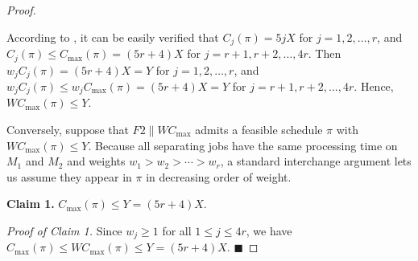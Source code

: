 ﻿\documentclass[12pt]{article}
\renewcommand{\thefigure}{\arabic{figure}}
\begin{document}
\begin{sloppypar}
\begin{proof}
\begin{figure}[H]
                \label{fig:nphard-3-partition}
            \end{figure}   
            
            According to , it can be easily verified that $C_j(\pi)=5jX$ for $j=1, 2, \ldots, r$, and $C_j(\pi) \leq C_{\max}(\pi)=(5r+4)X$ for $j=r+1, r+2, \ldots, 4r$. Then $w_j C_j(\pi)=(5r+4)X=Y$ for $j=1, 2, \ldots, r$, and $w_j C_j(\pi) \leq w_j C_{\max}(\pi)=(5r+4)X=Y$ for $j=r+1, r+2, \ldots, 4r$.      
            Hence, $W C_{\max}(\pi) \leq Y$.
            
            Conversely, suppose that $F2 \parallel WC_{\max}$ admits a feasible schedule $\pi$ with $W C_{\max}(\pi) \leq Y$. Because all separating jobs have the same processing time on $M_1$ and $M_2$ and weights $w_1 >w_2 > \cdots > w_r$, a standard interchange argument lets us assume they appear in $\pi$ in decreasing order of weight. 
            
            \textbf{Claim 1.} $C_{\max}(\pi) \leq Y=(5r+4)X$.
            
            \textit{Proof of Claim 1.}  Since $w_j \geq 1$ for all $1 \leq j \leq 4r$, we have $C_{\max}(\pi) \leq WC_{\max}(\pi) \leq Y=(5r+4)X$. \hfill$\blacksquare$
            

\end{proof}
\end{sloppypar}
\end{document}
